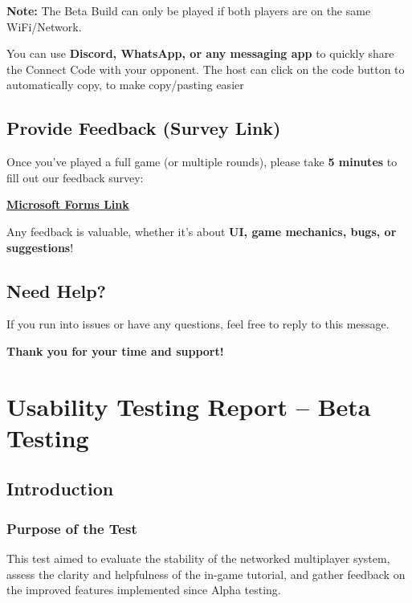 \documentclass[12pt, titlepage]{article}
\begin{document}
\textbf{Note:} The Beta Build can only be played if both players are on the same WiFi/Network.

\begin{tcolorbox}[colback=gray!10, colframe=black, title=Tip]
You can use \textbf{Discord, WhatsApp, or any messaging app} to quickly share the Connect Code with your opponent.
The host can click on the code button to automatically copy, to make copy/pasting easier
\end{tcolorbox}

\subsection{Provide Feedback (Survey Link)}

Once you’ve played a full game (or multiple rounds), please take \textbf{5 minutes} to fill out our feedback survey:

\href{https://forms.office.com/r/nYjE7qfsYG}{\textbf{Microsoft Forms Link}}

Any feedback is valuable, whether it's about \textbf{UI, game mechanics, bugs, or suggestions}!

\subsection{Need Help?}
If you run into issues or have any questions, feel free to reply to this message.

\bigskip

\begin{center}
\textbf{Thank you for your time and support!}
\end{center}


\newpage

\section{Usability Testing Report – Beta Testing}

\subsection{Introduction}

\subsubsection{Purpose of the Test}
This test aimed to evaluate the stability of the networked multiplayer system, assess the clarity and helpfulness of the in-game tutorial, and gather feedback on the improved features implemented since Alpha testing.
\end{document}
